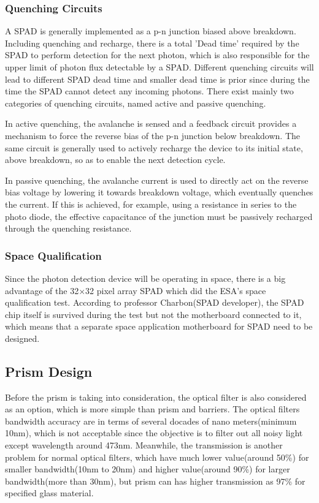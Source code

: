 \subsubsection{Quenching Circuits}
\label{AQC}
A \acs{SPAD} is generally implemented as a p-n junction biased above breakdown. Including quenching and recharge, there is a total 'Dead time' required by the \acs{SPAD} to perform detection for the next photon, which is also responsible for the upper limit of photon flux detectable by a \acs{SPAD}. Different quenching circuits will lead to different \acs{SPAD} dead time and smaller dead time is prior since during the time the \acs{SPAD} cannot detect any incoming photons. There exist mainly two categories of quenching circuits, named active and passive quenching. 

In active quenching, the avalanche is sensed and a feedback circuit provides a mechanism to force the reverse bias of the p-n junction below breakdown. The same circuit is generally used to actively recharge the device to its initial state, above breakdown, so as to enable the next detection cycle.

In passive quenching, the avalanche current is used to directly act on the reverse bias voltage by lowering it towards breakdown voltage, which eventually quenches the current. If this is achieved, for example, using a resistance in series to the photo diode, the effective capacitance of the junction must be passively recharged through the quenching resistance.

\subsubsection{Space Qualification}
\label{SQ}
Since the photon detection device will be operating in space, there is a big advantage of the 32$\times$32 pixel array \acs{SPAD} which did the \acs{ESA}'s space qualification test. According to professor Charbon(\acs{SPAD} developer), the \acs{SPAD} chip itself is survived during the test but not the motherboard connected to it, which means that a separate space application motherboard for \acs{SPAD} need to be designed.

\subsection{Prism Design}
\label{prism}
Before the prism is taking into consideration, the optical filter is also considered as an option, which is more simple than prism and barriers. The optical filters bandwidth accuracy are in terms of several docades of nano meters(minimum 10nm\cite{optical_filter}), which is not acceptable since the objective is to filter out all noisy light except wavelength around 473nm. Meanwhile, the transmission is another problem for normal optical filters, which have much lower value(around 50\%) for smaller bandwidth(10nm to 20nm) and higher value(around 90\%) for larger bandwidth(more than 30nm), but prism can has higher transmission as 97\% for specified glass material.

